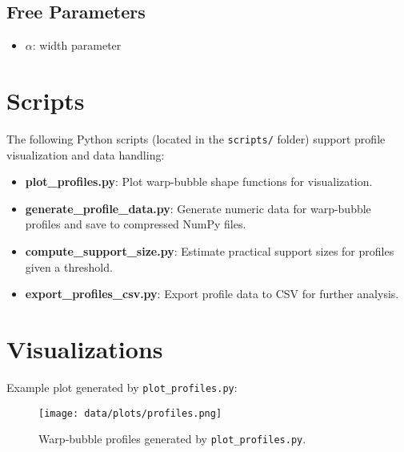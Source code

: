 \documentclass[11pt]{article}
\begin{document}
\subsection*{Free Parameters}
\begin{itemize}
  \item $\alpha$: width parameter
\end{itemize}

\section{Scripts}
The following Python scripts (located in the \texttt{scripts/} folder) support profile visualization and data handling:
\begin{itemize}
  \item \textbf{plot\_profiles.py}: Plot warp-bubble shape functions for visualization.
  \item \textbf{generate\_profile\_data.py}: Generate numeric data for warp-bubble profiles and save to compressed NumPy files.
  \item \textbf{compute\_support\_size.py}: Estimate practical support sizes for profiles given a threshold.
  \item \textbf{export\_profiles\_csv.py}: Export profile data to CSV for further analysis.
\end{itemize}

\section{Visualizations}
Example plot generated by \texttt{plot\_profiles.py}:
\begin{figure}[h]
  \centering
  \texttt{[image: data/plots/profiles.png]}
  \caption{Warp‐bubble profiles generated by \texttt{plot\_profiles.py}.}
\end{figure}

\end{document}
